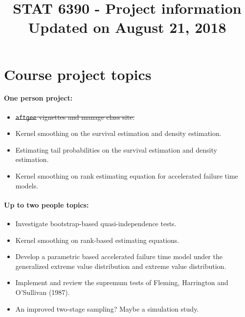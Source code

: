 \documentclass[a4paper,10pt]{article}
\title{STAT 6390 - Project information\\\vspace{.5cm}
\normalsize	Updated on August 21, 2018}
\date{}
\begin{document}
\maketitle
\section*{Course project topics}
\paragraph{One person project:}
\begin{itemize}
\item \sout{\texttt{aftgee} vignettes and manage class site.}
\item Kernel smoothing on the survival estimation and density estimation.
\item Estimating tail probabilities on the survival estimation and density estimation.
\item Kernel smoothing on rank estimating equation for accelerated failure time models.
\end{itemize}
\paragraph{Up to two people topics:}
\begin{itemize}
\item Investigate bootstrap-based quasi-independence tests. 
\item Kernel smoothing on rank-based estimating equations.
\item Develop a parametric based accelerated failure time model under the generalized extreme value distribution and extreme value distribution.
\item Implement and review the supremum tests of Fleming, Harrington and O'Sullivan (1987).
\item An improved two-stage sampling? Maybe a simulation study.
\end{itemize}

\newpage
\end{document}
